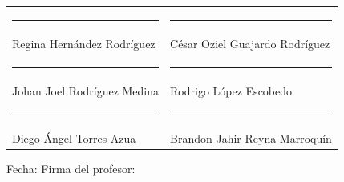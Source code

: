 \documentclass[12pt]{article}
\begin{document}
\vspace{1.5cm}

\noindent
\begin{tabular}{p{7cm} p{6cm}}
\rule{6cm}{0.4pt} & \rule{6cm}{0.4pt} \\
Regina Hernández Rodríguez & César Oziel Guajardo Rodríguez \\[1.5cm]
\rule{6cm}{0.4pt} & \rule{6cm}{0.4pt} \\
Johan Joel Rodríguez Medina & Rodrigo López Escobedo \\[1.5cm]
\rule{6cm}{0.4pt} & \rule{6cm}{0.4pt} \\
Diego Ángel Torres Azua & Brandon Jahir Reyna Marroquín \\
\end{tabular}

\vspace{1.5cm}
\noindent
Fecha: \underline{\hspace{5cm}} \hfill
Firma del profesor: \underline{\hspace{5cm}}
\end{document}
